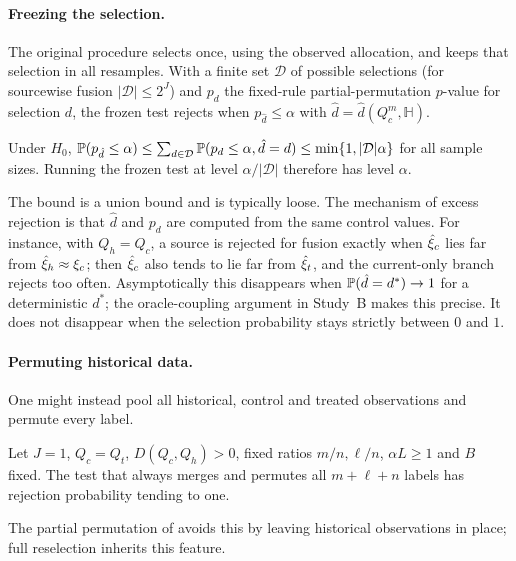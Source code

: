 \documentclass[11pt,a4paper]{article}
\begin{document}
\paragraph{Freezing the selection.} The original procedure selects once, using the observed allocation, and keeps that selection in all resamples. With a finite set $\mathcal D$ of possible selections (for sourcewise fusion $|\mathcal D|\le2^J$) and $p_d$ the fixed-rule partial-permutation $p$-value for selection $d$, the frozen test rejects when $p_{\hat d}\le\alpha$ with $\hat d=\hat d(Q_c^m,\mathbb H)$.

\begin{proposition}\label{prop:frozen}
Under $H_0$, $\P(p_{\hat d}\le\alpha)\le\sum_{d\in\mathcal D}\P(p_d\le\alpha,\hat d=d)\le\min\{1,|\mathcal D|\alpha\}$ for all sample sizes. Running the frozen test at level $\alpha/|\mathcal D|$ therefore has level $\alpha$.
\end{proposition}

The bound is a union bound and is typically loose. The mechanism of excess rejection is that $\hat d$ and $p_d$ are computed from the same control values. For instance, with $Q_h=Q_c$, a source is rejected for fusion exactly when $\hxi_c$ lies far from $\hxi_h\approx\xi_c$; then $\hxi_c$ also tends to lie far from $\hxi_t$, and the current-only branch rejects too often. Asymptotically this disappears when $\P(\hat d=d^\ast)\to1$ for a deterministic $d^\ast$; the oracle-coupling argument in Study~B makes this precise. It does not disappear when the selection probability stays strictly between $0$ and $1$.

\paragraph{Permuting historical data.} One might instead pool all historical, control and treated observations and permute every label.

\begin{proposition}\label{prop:fullperm}
Let $J=1$, $Q_c=Q_t$, $D(Q_c,Q_h)>0$, fixed ratios $m/n,\ell/n$, $\alpha L\ge1$ and $B$ fixed. The test that always merges and permutes all $m+\ell+n$ labels has rejection probability tending to one.
\end{proposition}

The partial permutation of \citet{yang2026} avoids this by leaving historical observations in place; full reselection inherits this feature.
\end{document}
